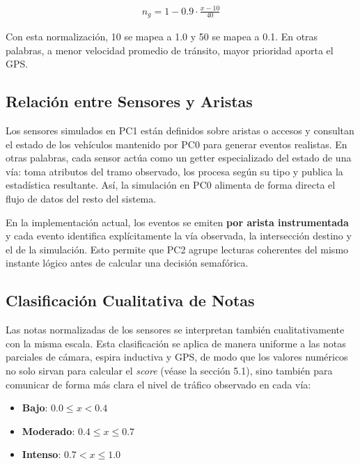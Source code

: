 \documentclass[12pt, a4paper]{article}
\let\oldtexttt\texttt
\renewcommand{\texttt}[1]{\oldtexttt{\seqsplit{#1}}}
\begin{document}
\begin{align}
    n_g = 1 - 0.9 \cdot \frac{x - 10}{40}
\end{align}

Con esta normalización, 10 se mapea a 1.0 y 50 se mapea a 0.1. En otras palabras, a menor velocidad promedio de tránsito, mayor prioridad aporta el GPS.

\subsection{Relación entre Sensores y Aristas}

Los sensores simulados en PC1 están definidos sobre aristas o accesos y consultan el estado de los vehículos mantenido por PC0 para generar eventos realistas. En otras palabras, cada sensor actúa como un getter especializado del estado de una vía: toma atributos del tramo observado, los procesa según su tipo y publica la estadística resultante. Así, la simulación en PC0 alimenta de forma directa el flujo de datos del resto del sistema.

En la implementación actual, los eventos se emiten \textbf{por arista instrumentada} y cada evento identifica explícitamente la vía observada, la intersección destino y el \texttt{tick\_origen} de la simulación. Esto permite que PC2 agrupe lecturas coherentes del mismo instante lógico antes de calcular una decisión semafórica.

\subsection{Clasificación Cualitativa de Notas}

Las notas normalizadas de los sensores se interpretan también cualitativamente con la misma escala. Esta clasificación se aplica de manera uniforme a las notas parciales de cámara, espira inductiva y GPS, de modo que los valores numéricos no solo sirvan para calcular el \textit{score} (véase la sección 5.1), sino también para comunicar de forma más clara el nivel de tráfico observado en cada vía:

\begin{itemize}
    \item \textbf{Bajo}: $0.0 \le x < 0.4$
    \item \textbf{Moderado}: $0.4 \le x \le 0.7$
    \item \textbf{Intenso}: $0.7 < x \le 1.0$
\end{itemize}
\end{document}

